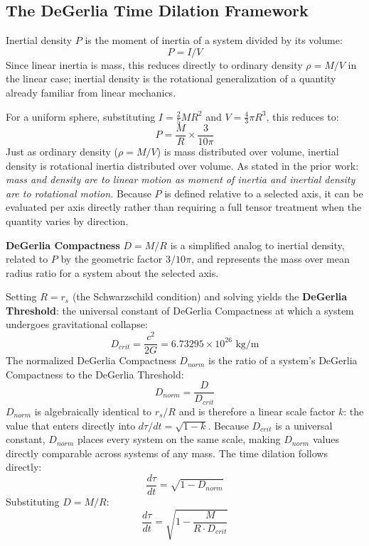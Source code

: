 \documentclass[twoside,twocolumn,9pt]{article}
\begin{document}
\subsection{The DeGerlia Time Dilation Framework}

Inertial density $P$ is the moment of inertia of a system divided by its volume:
\begin{equation}
P = I/V
\end{equation}
Since linear inertia is mass, this reduces directly to ordinary density $\rho = M/V$ in the linear case; inertial density is the rotational generalization of a quantity already familiar from linear mechanics.

For a uniform sphere, substituting $I = \frac{2}{5}MR^2$ and $V = \frac{4}{3}\pi R^3$, this reduces to:
\begin{equation}
P = \frac{M}{R} \times \frac{3}{10\pi}
\end{equation}
Just as ordinary density ($\rho = M/V$) is mass distributed over volume, inertial density is rotational inertia distributed over volume. As stated in the prior work: \textit{mass and density are to linear motion as moment of inertia and inertial density are to rotational motion.} Because $P$ is defined relative to a selected axis, it can be evaluated per axis directly rather than requiring a full tensor treatment when the quantity varies by direction.

\textbf{DeGerlia Compactness} $D = M/R$ is a simplified analog to inertial density, related to $P$ by the geometric factor $3/10\pi$, and represents the mass over mean radius ratio for a system about the selected axis.

Setting $R = r_s$ (the Schwarzschild condition) \citep{schwarzschild1916radius} and solving yields the \textbf{DeGerlia Threshold}: the universal constant of DeGerlia Compactness at which a system undergoes gravitational collapse:
\begin{equation}
D_{crit} = \frac{c^2}{2G} = 6.73295 \times 10^{26} \text{ kg/m}
\end{equation}
The normalized DeGerlia Compactness $D_{norm}$ is the ratio of a system's DeGerlia Compactness to the DeGerlia Threshold:
\begin{equation}
D_{norm} = \frac{D}{D_{crit}}
\end{equation}
$D_{norm}$ is algebraically identical to $r_s/R$ and is therefore a linear scale factor $k$: the value that enters directly into $d\tau/dt = \sqrt{1-k}$. Because $D_{crit}$ is a universal constant, $D_{norm}$ places every system on the same scale, making $D_{norm}$ values directly comparable across systems of any mass. The time dilation follows directly:
\begin{equation}
\frac{d\tau}{dt} = \sqrt{1 - D_{norm}}
\end{equation}
Substituting $D = M/R$:
\begin{equation}
\frac{d\tau}{dt} = \sqrt{1 - \frac{M}{R \cdot D_{crit}}}
\end{equation}
\end{document}
